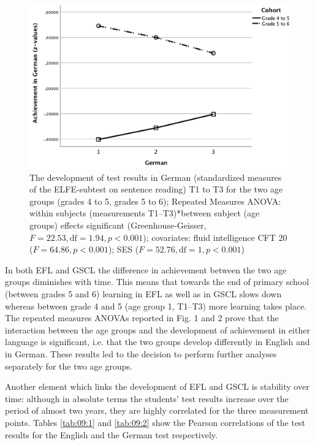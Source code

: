 \documentclass[output=paper]{langsci/langscibook}
\begin{document}
\begin{figure}
\includegraphics[width=\textwidth]{figures/figure9.2.pdf}
\caption{The development of test results in German (standardized measures of the ELFE-subtest on sentence reading) T1 to T3 for the two age groups (grades 4 to 5, grades 5 to 6); Repeated Measures ANOVA: within subjects (measurements T1–T3)*between subject (age groups) effects significant (Greenhouse-Geisser, $F=22.53, \text{df}=1.94, p<0.001$); covariates: fluid intelligence CFT 20 ($F=64.86, p<0.001$); SES ($F=52.76, \text{df}=1, p<0.001$)\label{fig:09:2}}
\end{figure}

In both EFL and GSCL the difference in achievement between the two age groups diminishes with time. This means that towards the end of primary school (between grades 5 and 6) learning in EFL as well as in GSCL slows down whereas between grade 4 and 5 (age group 1, T1–T3) more learning takes place. The repeated measures ANOVAs reported in Fig. 1 and 2 prove that the interaction between the age groups and the development of achievement in either language is significant, i.e. that the two groups develop differently in English and in German. These results led to the decision to perform further analyses separately for the two age groups.\largerpage[-1]

Another element which links the development of EFL and GSCL is stability over time: although in absolute terms the students’ test results increase over the period of almost two years, they are highly correlated for the three measurement points. Tables \ref{tab:09:1} and \ref{tab:09:2} show the Pearson correlations of the test results for the English and the German test respectively.
\end{document}
